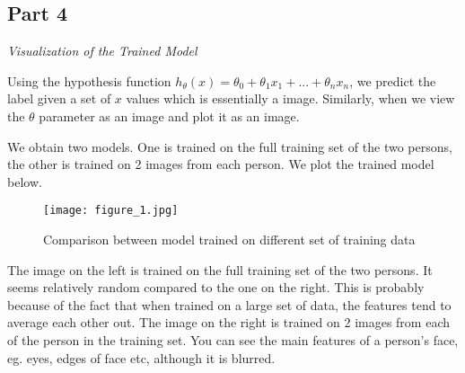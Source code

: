 \documentclass{article}
\begin{document}
\newpage
\begin{part4}

\maketitle

\newpage
\section{Part 4}
\noindent \textit{Visualization of the Trained Model}

\vspace{5mm}

Using the hypothesis function $h_\theta (x) = \theta_0 + \theta_1 x_1 + ... + \theta_n x_n$, we predict the label given a set of $x$ values which is essentially a image. Similarly, when we view the $\theta$ parameter as an image and plot it as an image.

\vspace{5mm}

We obtain two models. One is trained on the full training set of the two persons, the other is trained on 2 images from each person. We plot the trained model below.

\begin{figure*}[h!]
    \centering
    \texttt{[image: figure\_1.jpg]}
    \caption{Comparison between model trained on different set of training data}
    \label{fig:mean_a}
\end{figure*}

The image on the left is trained on the full training set of the two persons. It seems relatively random compared to the one on the right. This is probably because of the fact that when trained on a large set of data, the features tend to average each other out. The image on the right is trained on 2 images from each of the person in the training set. You can see the main features of a person's face, eg. eyes, edges of face etc, although it is blurred.




\end{part4}
\end{document}
